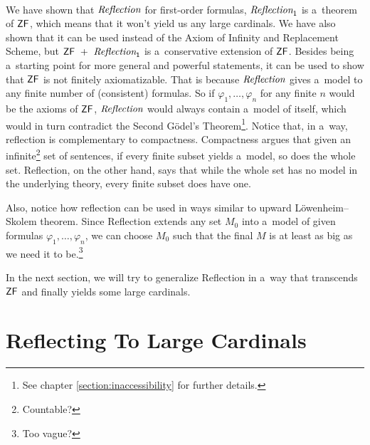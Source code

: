 \documentclass[12pt,a4paper]{article}
\begin{document}
\

We have shown that $\emph{Reflection}$ for first-order formulas, $\emph{Reflection}_1$ is a~theorem of $\sf{ZF}$, which means that it won't yield us any large cardinals. We have also shown that it can be used instead of the Axiom of Infinity and Replacement Scheme, but $\sf{ZF}\ +\ \emph{Reflection}_1$ is a~conservative extension of $\sf{ZF}$. Besides being a~starting point for more general and powerful statements, it can be used to show that $\sf{ZF}$ is not finitely axiomatizable. That is because $\emph{Reflection}$ gives a~model to any finite number of (consistent) formulas. So if $\varphi_1, \ldots, \varphi_n$ for any finite $n$ would be the axioms of $\sf{ZF}$, $\emph{Reflection}$ would always contain a~model of itself, which would in turn contradict the Second Gödel's Theorem\footnote{See chapter \ref{section:inaccessibility} for further details.}.
Notice that, in a~way, reflection is complementary to compactness. Compactness argues that given an infinite\footnote{Countable?} set of sentences, if every finite subset yields a~model, so does the whole set. Reflection, on the other hand, says that while the whole set has no model in the underlying theory, every finite subset does have one.

Also, notice how reflection can be used in ways similar to upward Löwenheim–Skolem theorem. Since Reflection extends any set $M_0$ into a~model of given formulas $\varphi_1, \ldots, \varphi_n$, we can choose $M_0$ such that the final $M$ is at least as big as we need it to be.\footnote{Too vague?}


In the next section, we will try to generalize Reflection in a~way that transcends $\sf{ZF}$ and finally yields some large cardinals.

\newpage
\section{Reflecting To Large Cardinals} %
\end{document}
